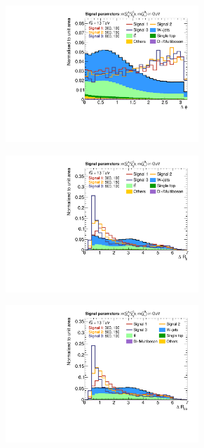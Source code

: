 \begin{figure}
\begin{subfigure}[b]{0.5\linewidth}
	\end{subfigure}\hfill
	\begin{subfigure}[b]{0.5\linewidth}
		\centering\includegraphics[width=0.8\textwidth]{presel/dphimetlep}
	\end{subfigure}\hfill
	\par\medskip
	\begin{subfigure}[b]{0.5\linewidth}
		\centering\includegraphics[width=0.8\textwidth]{presel/dRJet}
	\end{subfigure}\hfill
	\begin{subfigure}[b]{0.5\linewidth}
		\centering\includegraphics[width=0.8\textwidth]{presel/dRJBet}

\end{subfigure}
\end{figure}
